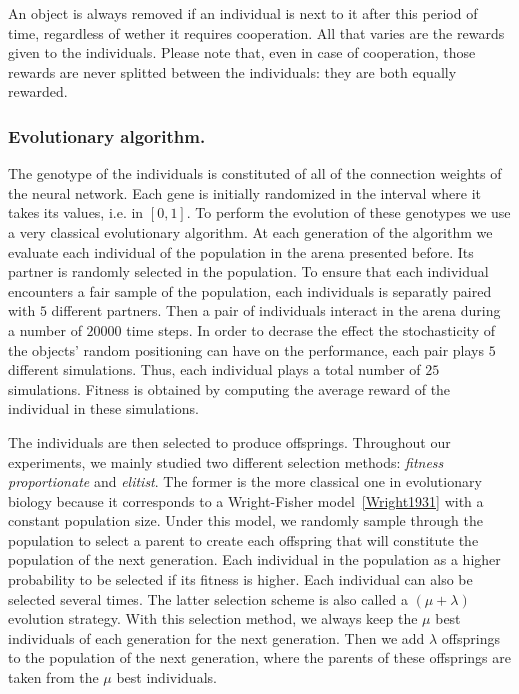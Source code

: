     An object is always removed if an individual is next to it after this period of time, regardless of wether it requires cooperation. All that varies are the rewards given to the individuals. Please note that, even in case of cooperation, those rewards are never splitted between the individuals: they are both equally rewarded.

    \subsubsection{Evolutionary algorithm.} The genotype of the individuals is constituted of all of the connection weights of the neural network. Each gene is initially randomized in the interval where it takes its values, i.e. in \([0,1]\). To perform the evolution of these genotypes we use a very classical evolutionary algorithm. At each generation of the algorithm we evaluate each individual of the population in the arena presented before. Its partner is randomly selected in the population. To ensure that each individual encounters a fair sample of the population, each individuals is separatly paired with $5$ different partners. Then a pair of individuals interact in the arena during a number of $20000$ time steps. In order to decrase the effect the stochasticity of the objects' random positioning can have on the performance, each pair plays $5$ different simulations. Thus, each individual plays a total number of $25$ simulations. Fitness is obtained by computing the average reward of the individual in these simulations.

    The individuals are then selected to produce offsprings. Throughout our experiments, we mainly studied two different selection methods: \emph{fitness proportionate} and \emph{elitist}. The former is the more classical one in evolutionary biology because it corresponds to a Wright-Fisher model~\ref{Wright1931} with a constant population size. Under this model, we randomly sample through the population to select a parent to create each offspring that will constitute the population of the next generation. Each individual in the population as a higher probability to be selected if its fitness is higher. Each individual can also be selected several times. The latter selection scheme is also called a \((\mu + \lambda)\) evolution strategy. With this selection method, we always keep the $\mu$ best individuals of each generation for the next generation. Then we add $\lambda$ offsprings to the population of the next generation, where the parents of these offsprings are taken from the $\mu$ best individuals. 

